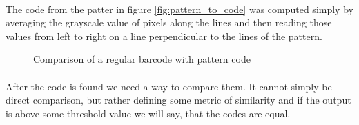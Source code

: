 \paragraph{}
The code from the patter in figure \ref{fig:pattern_to_code} was computed simply by averaging the grayscale value of pixels along the lines and then reading those values from left to right on a line perpendicular to the lines of the pattern.

\begin{figure}[H]
     \centering
     \hfill
     \caption{Comparison of a regular barcode with pattern code}
     \label{fig:regular_vs_pattern_code}
\end{figure}
\paragraph{}
After the code is found we need a way to compare them. It cannot simply be direct comparison, but rather defining some metric of similarity and if the output is above some threshold value we will say, that the codes are equal.